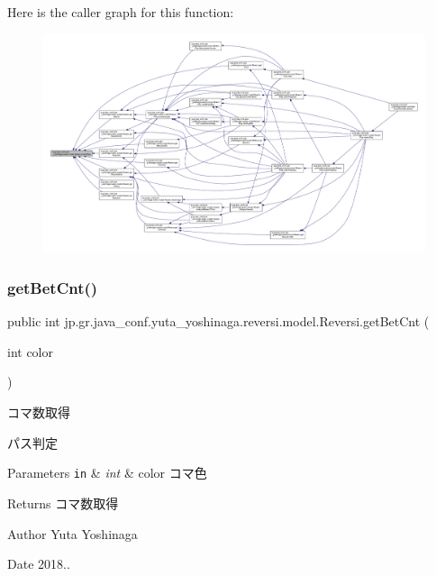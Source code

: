 Here is the caller graph for this function\+:
\nopagebreak
\begin{figure}[H]
\begin{center}
\leavevmode
\includegraphics[width=350pt]{classjp_1_1gr_1_1java__conf_1_1yuta__yoshinaga_1_1reversi_1_1model_1_1_reversi_afbad8b2c3b2423a7490f9a3b636584d3_icgraph}
\end{center}
\end{figure}
\mbox{\label{classjp_1_1gr_1_1java__conf_1_1yuta__yoshinaga_1_1reversi_1_1model_1_1_reversi_a9f826e110ec3298a6bc5d6987a94519c}} 
\subsubsection{\texorpdfstring{get\+Bet\+Cnt()}{getBetCnt()}}
{\footnotesize\ttfamily public int jp.\+gr.\+java\+\_\+conf.\+yuta\+\_\+yoshinaga.\+reversi.\+model.\+Reversi.\+get\+Bet\+Cnt (\begin{DoxyParamCaption}\item[{int}]{color }\end{DoxyParamCaption})}



コマ数取得 

パス判定


\begin{DoxyParams}[1]{Parameters}
\mbox{\tt in}  & {\em int} & color コマ色 \\
\hline
\end{DoxyParams}
\begin{DoxyReturn}{Returns}
コマ数取得 
\end{DoxyReturn}
\begin{DoxyAuthor}{Author}
Yuta Yoshinaga 
\end{DoxyAuthor}
\begin{DoxyDate}{Date}
2018..
\end{DoxyDate}

